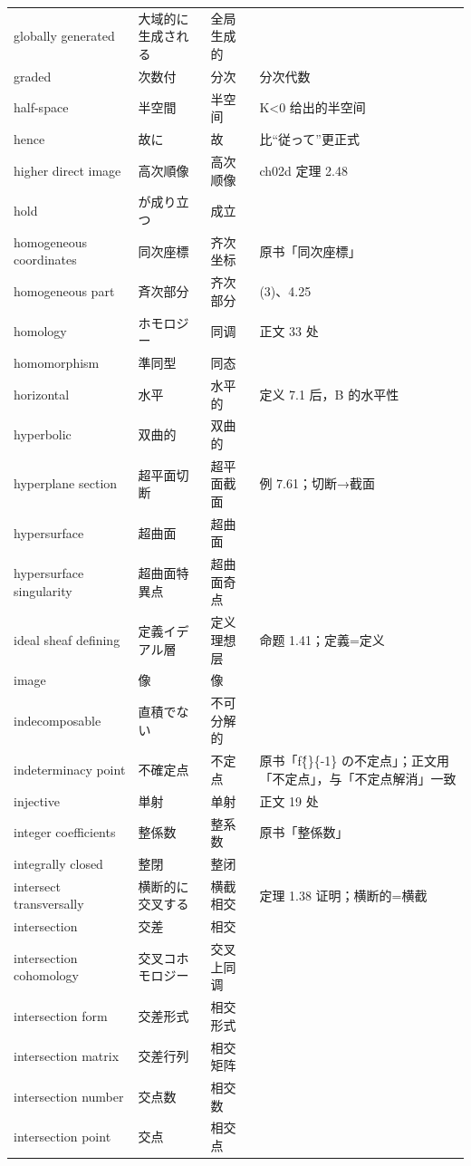 \begin{longtable}{@{}>{\raggedright\arraybackslash}p{}>{\raggedright\arraybackslash}p{}>{\raggedright\arraybackslash}p{}>{\raggedright\arraybackslash}p{}@{}}
globally generated & 大域的に生成される & 全局生成的 &  \\
graded & 次数付 & 分次 & 分次代数 \\
half-space & 半空間 & 半空间 & K<0 给出的半空间 \\
hence & 故に & 故 & 比“従って”更正式 \\
higher direct image & 高次順像 & 高次顺像 & ch02d 定理 2.48 \\
hold & が成り立つ & 成立 &  \\
homogeneous coordinates & 同次座標 & 齐次坐标 & 原书「同次座標」 \\
homogeneous part & 斉次部分 & 齐次部分 & 4.24(3)、4.25 \\
homology & ホモロジー & 同调 & 正文 33 处 \\
homomorphism & 準同型 & 同态 &  \\
horizontal & 水平 & 水平的 & 定义 7.1 后，B 的水平性 \\
hyperbolic & 双曲的 & 双曲的 &  \\
hyperplane section & 超平面切断 & 超平面截面 & 例 7.61；切断→截面 \\
hypersurface & 超曲面 & 超曲面 &  \\
hypersurface singularity & 超曲面特異点 & 超曲面奇点 &  \\
ideal sheaf defining & 定義イデアル層 & 定义理想层 & 命题 1.41；定義=定义 \\
image & 像 & 像 &  \\
indecomposable & 直積でない & 不可分解的 & 7.75 \\
indeterminacy point & 不確定点 & 不定点 & 原书「f\^\{\}\{-1\} の不定点」；正文用「不定点」，与「不定点解消」一致 \\
injective & 単射 & 单射 & 正文 19 处 \\
integer coefficients & 整係数 & 整系数 & 原书「整係数」 \\
integrally closed & 整閉 & 整闭 &  \\
intersect transversally & 横断的に交叉する & 横截相交 & 定理 1.38 证明；横断的=横截 \\
intersection & 交差 & 相交 &  \\
intersection cohomology & 交叉コホモロジー & 交叉上同调 &  \\
intersection form & 交差形式 & 相交形式 &  \\
intersection matrix & 交差行列 & 相交矩阵 &  \\
intersection number & 交点数 & 相交数 &  \\
intersection point & 交点 & 相交点 &  \\

\end{longtable}
